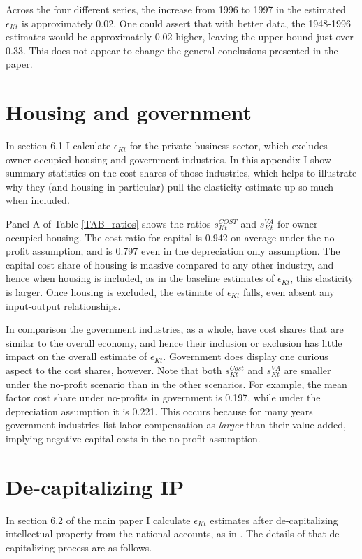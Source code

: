 \documentclass[11pt]{article}
\begin{document}
Across the four different series, the increase from 1996 to 1997 in the estimated $\epsilon_{Kt}$ is approximately 0.02. One could assert that with better data, the 1948-1996 estimates would be approximately 0.02 higher, leaving the upper bound just over 0.33. This does not appear to change the general conclusions presented in the paper. 

\section{Housing and government}
In section 6.1 I calculate $\epsilon_{Kt}$ for the private business sector, which excludes owner-occupied housing and government industries. In this appendix I show summary statistics on the cost shares of those industries, which helps to illustrate why they (and housing in particular) pull the elasticity estimate up so much when included. 

Panel A of Table \ref{TAB_ratios} shows the ratios $s^{COST}_{Kt}$ and $s^{VA}_{Kt}$ for owner-occupied housing. The cost ratio for capital is 0.942 on average under the no-profit assumption, and is 0.797 even in the depreciation only assumption. The capital cost share of housing is massive compared to any other industry, and hence when housing is included, as in the baseline estimates of $\epsilon_{Kt}$, this elasticity is larger. Once housing is excluded, the estimate of $\epsilon_{Kt}$ falls, even absent any input-output relationships. 

In comparison the government industries, as a whole, have cost shares that are similar to the overall economy, and hence their inclusion or exclusion has little impact on the overall estimate of $\epsilon_{Kt}$. Government does display one curious aspect to the cost shares, however. Note that both $s_{Kt}^{Cost}$ and $s_{Kt}^{VA}$ are smaller under the no-profit scenario than in the other scenarios. For example, the mean factor cost share under no-profits in government is 0.197, while under the depreciation assumption it is 0.221. This occurs because for many years government industries list labor compensation as \textit{larger} than their value-added, implying negative capital costs in the no-profit assumption. 

\section{De-capitalizing IP}
In section 6.2 of the main paper I calculate $\epsilon_{Kt}$ estimates after de-capitalizing intellectual property from the national accounts, as in \cite{ksz2020}. The details of that de-capitalizing process are as follows.
\end{document}
